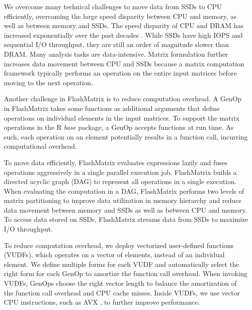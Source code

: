 
We overcome many technical challenges to move data from SSDs to CPU efficiently,
overcoming the large speed disparity between CPU and memory, as well as between
memory and
SSDs. The speed disparity of CPU and DRAM has increased exponentially over
the past decades \cite{Wilkes01}. While SSDs have high IOPS and sequential
I/O throughput, they are still an order of magnitude slower than DRAM.
Many analysis tasks are data-intensive. Matrix
formulation further increases data movement between CPU and SSDs because
a matrix computation framework typically performs an operation
on the entire input matrices before moving to the next operation.

Another challenge in FlashMatrix is to reduce computation overhead. A GenOp in
FlashMatrix takes some functions as additional arguments that define operations
on individual elements in the input matrices. To support the matrix operations
in the R \textit{base} package, a GenOp accepts functions at run time.
As such, each operation on an element potentially results in a function call,
incurring computational overhead.

To move data efficiently, FlashMatrix evaluates expressions lazily and fuses
operations aggressively in a single parallel execution job.
FlashMatrix builds a directed acyclic graph (DAG) to represent all operations
in a single execution. When evaluating the computation in a DAG, FlashMatrix
performs two levels of matrix partitioning to improve data utilization in
memory hierarchy and reduce data movement between memory and SSDs
as well as between CPU and memory. To access data stored on SSDs, FlashMatrix
streams data from SSDs to maximize I/O throughput.


To reduce computation overhead, we deploy vectorized user-defined
functions (VUDFs), which operates on a vector of elements, instead of
an individual element. We define multiple forms for each VUDF and automatically
select the right form for each GenOp to amortize the function call overhead.
When invoking VUDFs, GenOps choose the right vector length to balance
the amortization of the function call overhead and CPU cache misses.
Inside VUDFs, we use vector CPU instructions, such as AVX \cite{avx},
to further improve performance.

